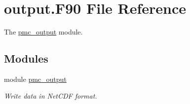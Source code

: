 \hypertarget{output_8_f90}{}\section{output.\+F90 File Reference}
\label{output_8_f90}


The \mbox{\hyperlink{namespacepmc__output}{pmc\+\_\+output}} module.  


\subsection*{Modules}
\begin{DoxyCompactItemize}
\item 
module \mbox{\hyperlink{namespacepmc__output}{pmc\+\_\+output}}
\begin{DoxyCompactList}\small\item\em Write data in Net\+C\+DF format. \end{DoxyCompactList}\end{DoxyCompactItemize}
